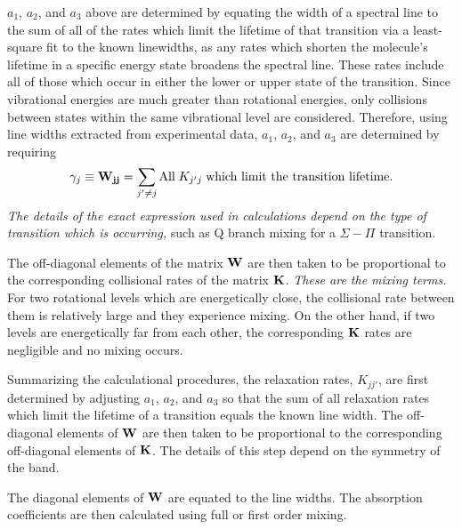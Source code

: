 \documentclass[11pt]{article}
\begin{document}
$a_{1}$, $a_{2}$, and $a_{3}$ above are determined 
by equating the width of a spectral line to the sum of all of the rates
which limit the lifetime of that transition via a least-square fit to the
known linewidths, as any rates which shorten the molecule's lifetime in a 
specific energy state broadens the spectral line. These rates include all 
of those which occur in either the lower or upper state of the transition. 
Since vibrational energies are much greater than rotational energies, only
collisions between states within the same vibrational level are considered.
Therefore, using line widths extracted from experimental data, $a_{1}$,
$a_{2}$, and $a_{3}$ are determined by requiring
\[
\gamma_{j} \equiv {\bf W_{jj}} = \sum_{j'\neq j}
\mbox{All} \; K_{j'j} \; \mbox{which limit the transition lifetime}.
\]
{\em The details of the exact expression used in calculations
depend on the type of transition which is occurring,} such as Q branch 
mixing for a $\Sigma-\Pi$ transition.

The off-diagonal elements of the matrix ${\bf W}$ are then taken to be 
proportional to the corresponding collisional rates of the matrix 
${\bf K}$.  {\it These are the mixing terms.} 
For two rotational levels which are energetically close, the collisional 
rate between them is relatively large and they experience mixing.  On the 
other hand, if two levels are energetically far from each other, the 
corresponding ${\bf K}$ rates are negligible and no mixing occurs.

Summarizing the calculational procedures, the relaxation rates, $K_{jj'}$, 
are first determined by adjusting $a_{1}$, $a_{2}$,
and $a_{3}$ so that the sum of all relaxation rates which limit the
lifetime of a transition equals the known line width.  
The off-diagonal elements of ${\bf W}$ are then taken to be proportional to 
the corresponding off-diagonal elements of ${\bf K}$.  The details of this 
step depend on the symmetry of the band.

The diagonal elements of ${\bf W}$ are equated to the line widths.
The absorption coefficients are then calculated using 
full or first order mixing.  
\end{document}
